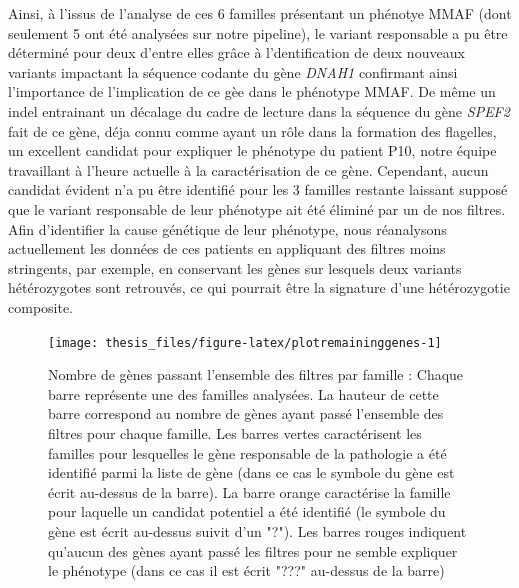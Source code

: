 \documentclass[12pt,twoside]{reedthesis}
\theoremstyle{definition}
\theoremstyle{definition}
\theoremstyle{remark}
\begin{document}
  Ainsi, à l'issus de l'analyse de ces 6 familles présentant un phénotye
  MMAF (dont seulement 5 ont été analysées sur notre pipeline), le variant
  responsable a pu être déterminé pour deux d'entre elles grâce à
  l'dentification de deux nouveaux variants impactant la séquence codante
  du gène \emph{DNAH1} confirmant ainsi l'importance de l'implication de
  ce gèe dans le phénotype MMAF. De même un indel entrainant un décalage
  du cadre de lecture dans la séquence du gène \emph{SPEF2} fait de ce
  gène, déja connu comme ayant un rôle dans la formation des flagelles, un
  excellent candidat pour expliquer le phénotype du patient P10, notre
  équipe travaillant à l'heure actuelle à la caractérisation de ce gène.
  Cependant, aucun candidat évident n'a pu être identifié pour les 3
  familles restante laissant supposé que le variant responsable de leur
  phénotype ait été éliminé par un de nos filtres. Afin d'identifier la
  cause génétique de leur phénotype, nous réanalysons actuellement les
  données de ces patients en appliquant des filtres moins stringents, par
  exemple, en conservant les gènes sur lesquels deux variants
  hétérozygotes sont retrouvés, ce qui pourrait être la signature d'une
  hétérozygotie composite.
  
  \newpage
  
  \begin{figure}
  
  {\centering \texttt{[image: thesis\_files/figure-latex/plotremaininggenes-1]} 
  
  }
  
  \caption[Nombre de gènes passant l'ensemble des filtres par famille]{Nombre de gènes passant l'ensemble des filtres par famille  :  Chaque barre représente une des familles analysées. La hauteur de cette barre correspond au nombre de gènes ayant passé l'ensemble des filtres pour chaque famille. Les barres vertes caractérisent les familles pour lesquelles le gène responsable de la pathologie a été identifié parmi la liste de gène (dans ce cas le symbole du gène est écrit au-dessus de la barre). La barre orange caractérise la famille pour laquelle un candidat potentiel a été identifié (le symbole du gène est écrit au-dessus suivit d'un "?"). Les barres rouges indiquent qu'aucun des gènes ayant passé les filtres pour ne semble expliquer le phénotype (dans ce cas il est écrit "???" au-dessus de la barre)}\label{fig:plotremaininggenes}
  \end{figure}
  
  \newpage
  
\end{document}
